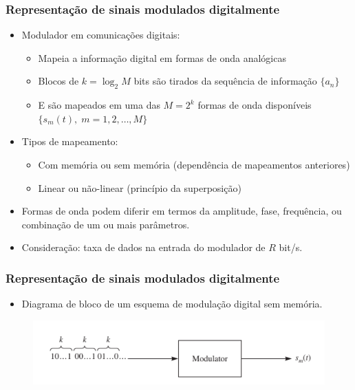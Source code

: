 \begin{frame}
	\frametitle{Representação de sinais modulados digitalmente}

	\begin{itemize}
	  \item Modulador em comunicações digitais:
	  \begin{itemize}
	   \item Mapeia a informação digital em formas de onda analógicas
	   \item Blocos de $k=\log_2 M$ bits são tirados da sequência de informação $\{ a_n \}$
	   \item E são mapeados em uma das $M = 2^k$ formas de onda disponíveis $\{ s_m(t), \; m=1,2,\ldots, M \}$
	  \end{itemize}
	  \item Tipos de mapeamento:
	  \begin{itemize}
	   \item Com memória ou sem memória (dependência de mapeamentos anteriores)
	   \item Linear ou não-linear (princípio da superposição)
	  \end{itemize}
	  \item Formas de onda podem diferir em termos da amplitude, fase, frequência, ou combinação de um ou mais parâmetros.
	  \item Consideração: taxa de dados na entrada do modulador de $R$ bit/s.
	\end{itemize}

\end{frame}

\begin{frame}
	\frametitle{Representação de sinais modulados digitalmente}

	\begin{itemize}
		\item Diagrama de bloco de um esquema de modulação digital sem memória.
	\end{itemize}

	\begin{figure}[t]
	  \begin{center}
	    \includegraphics[width=0.7\columnwidth]{figs/mapping}
	  \end{center}
	\end{figure}

\end{frame}

